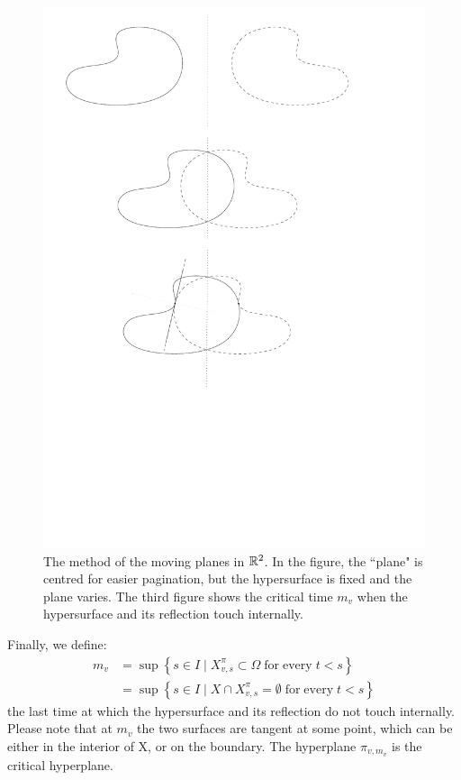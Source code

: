 \begin{figure}
	\centering
	\includegraphics[width=\textwidth]{"figures/6_method moving planes"}
	\caption{The method of the moving planes in $\mathbb{R}^2$. In the figure, the ``plane" is centred for easier pagination, but the hypersurface is fixed and the plane varies. The third figure shows the critical time $m_v$ when the hypersurface and its reflection touch internally.}
\end{figure}

Finally, we define: 
\begin{align*}
m_v &= \sup\left\{s \in I \;|\; X_{v, s}^\pi \subset \Omega \; \mathrm{ for \; every }\; t < s \right\}\\
 &= \sup\left\{s \in I \;|\; X \cap X_{v, s}^\pi =\emptyset \; \mathrm{ for \; every }\; t < s \right\}
\end{align*}
the last time at which the hypersurface and its reflection do not touch internally. Please note that at $m_v$ the two surfaces are tangent at some point, which can be either in the interior of X, or on the boundary. The hyperplane $\pi_{v, m_v}$ is the critical hyperplane. 


